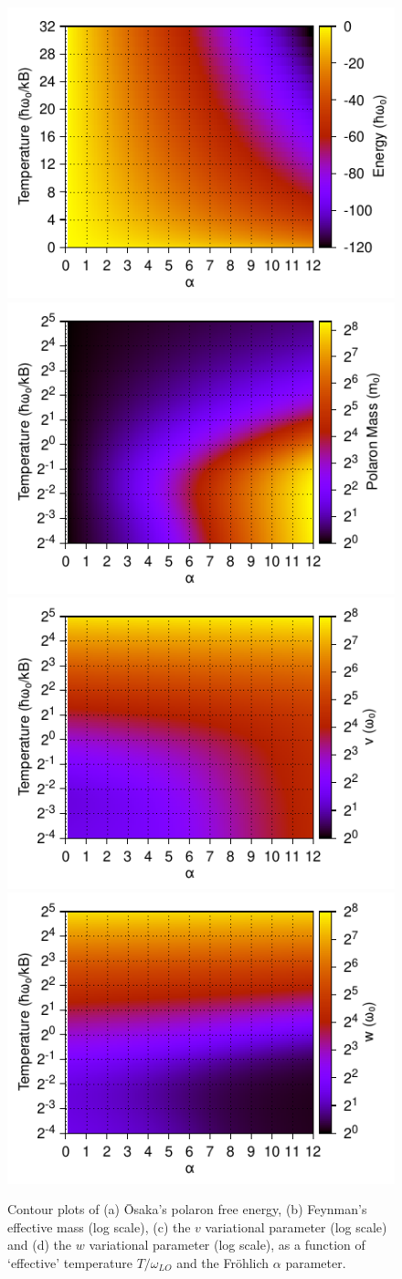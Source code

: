 \begin{figure}[t]
    \centering
    \includegraphics[width = .49\textwidth]{figures/frohlich-3d-energy-temp-00625to32-contourf-COLOUR.pdf}
    \includegraphics[width = .49\textwidth]{figures/frohlich-3d-mass-temp-00625to32-contourf-COLOUR.pdf}
    \includegraphics[width = .49\textwidth]{figures/frohlich-3d-v-temp-00625to32-contourf-COLOUR.pdf}
    \includegraphics[width = .49\textwidth]{figures/frohlich-3d-w-temp-00625to32-contourf-COLOUR.pdf}
    \caption{Contour plots of (a) \=Osaka's polaron free energy, (b) Feynman's effective mass (log scale), (c) the $v$ variational parameter (log scale) and (d) the $w$ variational parameter (log scale), as a function of `effective' temperature $T / \omega_{LO}$ and the Fr\"ohlich $\alpha$ parameter.}
    \label{fig:thermaltheory}
\end{figure}

